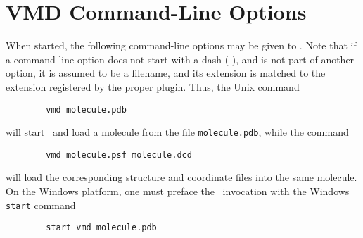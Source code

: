 \section{VMD Command-Line Options}

When started, the following command-line options may be given to \VMD. Note
that if a command-line option does not start with a dash (-), and is not
part of another option, it is assumed to be a filename, and its extension is
matched to the extension registered by the proper plugin. Thus, the Unix
command
\begin{verbatim}
        vmd molecule.pdb 
\end{verbatim}
will start \VMD\ and load a molecule from the file {\tt molecule.pdb}, while
the command
\begin{verbatim}
        vmd molecule.psf molecule.dcd
\end{verbatim}
will load the corresponding structure and coordinate files into the same
molecule.
On the Windows platform, one must preface the \VMD\ invocation
with the Windows {\tt start} command 
\begin{verbatim}
        start vmd molecule.pdb 
\end{verbatim}

